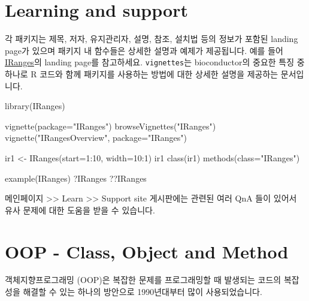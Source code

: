 \documentclass[
  a4paper,
]{book}
\newenvironment{Shaded}{\begin{snugshade}}{\end{snugshade}}
\newcommand{\AttributeTok}[1]{\textcolor[rgb]{0.40,0.45,0.13}{#1}}
\newcommand{\DecValTok}[1]{\textcolor[rgb]{0.68,0.00,0.00}{#1}}
\newcommand{\FunctionTok}[1]{\textcolor[rgb]{0.28,0.35,0.67}{#1}}
\newcommand{\NormalTok}[1]{\textcolor[rgb]{0.00,0.23,0.31}{#1}}
\newcommand{\OtherTok}[1]{\textcolor[rgb]{0.00,0.23,0.31}{#1}}
\newcommand{\SpecialCharTok}[1]{\textcolor[rgb]{0.37,0.37,0.37}{#1}}
\newcommand{\StringTok}[1]{\textcolor[rgb]{0.13,0.47,0.30}{#1}}
\begin{document}
\hypertarget{learning-and-support}{%
\section{Learning and support}\label{learning-and-support}}

각 패키지는 제목, 저자, 유지관리자, 설명, 참조, 설치법 등의 정보가
포함된 landing page가 있으며 패키지 내 함수들은 상세한 설명과 예제가
제공됩니다. 예를 들어
\href{http://bioconductor.org/packages/release/bioc/html/IRanges.html}{IRanges}의
landing page를 참고하세요. \texttt{vignettes}는 bioconductor의 중요한
특징 중 하나로 R 코드와 함께 패키지를 사용하는 방법에 대한 상세한 설명을
제공하는 문서입니다.

\begin{Shaded}
\begin{Highlighting}[]
\FunctionTok{library}\NormalTok{(IRanges)}

\FunctionTok{vignette}\NormalTok{(}\AttributeTok{package=}\StringTok{"IRanges"}\NormalTok{)}
\FunctionTok{browseVignettes}\NormalTok{(}\StringTok{"IRanges"}\NormalTok{)}
\FunctionTok{vignette}\NormalTok{(}\StringTok{"IRangesOverview"}\NormalTok{, }\AttributeTok{package=}\StringTok{"IRanges"}\NormalTok{)}

\NormalTok{ir1 }\OtherTok{\textless{}{-}} \FunctionTok{IRanges}\NormalTok{(}\AttributeTok{start=}\DecValTok{1}\SpecialCharTok{:}\DecValTok{10}\NormalTok{, }\AttributeTok{width=}\DecValTok{10}\SpecialCharTok{:}\DecValTok{1}\NormalTok{)}
\NormalTok{ir1}
\FunctionTok{class}\NormalTok{(ir1)}
\FunctionTok{methods}\NormalTok{(}\AttributeTok{class=}\StringTok{"IRanges"}\NormalTok{)}

\FunctionTok{example}\NormalTok{(IRanges)}
\NormalTok{?IRanges}
\NormalTok{??IRanges}
\end{Highlighting}
\end{Shaded}

메인페이지 \textgreater\textgreater{} Learn \textgreater\textgreater{}
Support site 게시판에는 관련된 여러 QnA 들이 있어서 유사 문제에 대한
도움을 받을 수 있습니다.

\hypertarget{oop---class-object-and-method}{%
\section{OOP - Class, Object and
Method}\label{oop---class-object-and-method}}

객체지향프로그래밍 (OOP)은 복잡한 문제를 프로그래밍할 때 발생되는 코드의
복잡성을 해결할 수 있는 하나의 방안으로 1990년대부터 많이
사용되었습니다.
\end{document}
